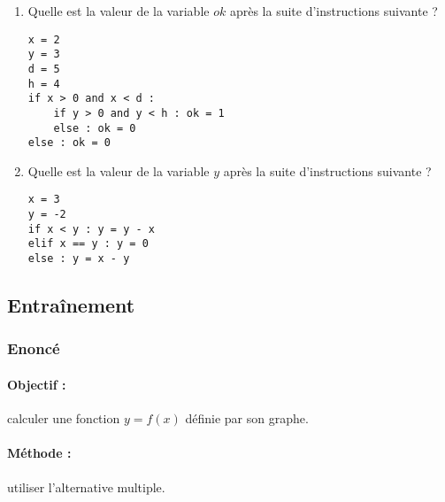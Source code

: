\begin{question}\mbox{}

\noindent\begin{minipage}[t]{7cm}
\begin{enumerate}
\item Quelle est la valeur de la variable $ok$ après la suite
	d'instructions suivante ?

\footnotesize\tt\begin{Verbatim}
x = 2
y = 3
d = 5
h = 4
if x > 0 and x < d :
    if y > 0 and y < h : ok = 1
    else : ok = 0
else : ok = 0
\end{Verbatim}
\end{enumerate}
\end{minipage}
\begin{minipage}[t]{7cm}
\begin{enumerate}\setcounter{enumi}{1}
\item Quelle est la valeur de la variable $y$ après la suite
	d'instructions suivante ?

\footnotesize\tt\begin{Verbatim}
x = 3
y = -2
if x < y : y = y - x
elif x == y : y = 0
else : y = x - y
\end{Verbatim}
\end{enumerate}
\end{minipage}


\end{question}


\subsection{Entraînement}

\subsubsection{Enoncé}

\paragraph{Objectif :} calculer une fonction $y = f(x)$
définie par son graphe.

\paragraph{Méthode :} utiliser l'alternative multiple.


